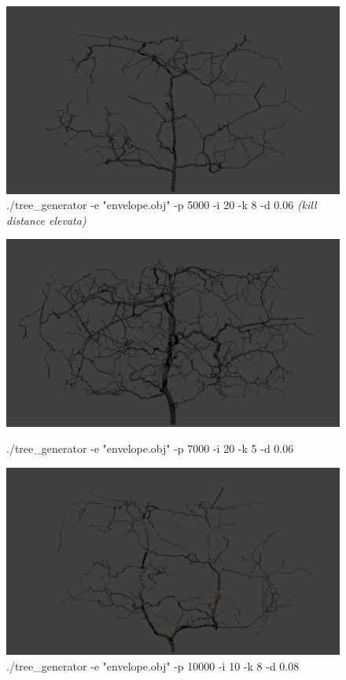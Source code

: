 \documentclass[10pt,a4paper]{report}
\begin{document}
\begin{figure}[h]
\centering
\includegraphics[scale=0.45]{figura5.png}
\caption{./tree\_generator -e "envelope.obj" -p 5000 -i 20 -k 8 -d 0.06 \textit{(kill distance elevata)}}

\end{figure}
\begin{figure}[ht!]
\centering
\includegraphics[scale=0.45]{figura6.png}
\caption{./tree\_generator -e "envelope.obj" -p 7000 -i 20 -k 5 -d 0.06}
\includegraphics[scale=0.45]{figura7.png}
\caption{./tree\_generator -e "envelope.obj" -p 10000 -i 10 -k 8 -d 0.08}
\end{figure}
\end{document}
